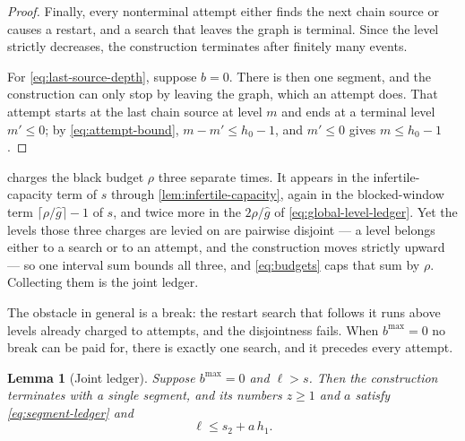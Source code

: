 \documentclass[11pt]{article}
\theoremstyle{plain}
\newtheorem{lemma}{Lemma}
\theoremstyle{remark}
\newcommand{\ghat}{\widehat g}
\begin{document}
\begin{proof}
Finally, every nonterminal attempt either finds the next chain source or causes a restart, and a
search that leaves the graph is terminal.  Since the level strictly decreases, the
construction terminates after finitely many events.

For \eqref{eq:last-source-depth}, suppose \(b=0\).  There is then one segment, and the
construction can only stop by leaving the graph, which an attempt does.  That attempt
starts at the last chain source at level \(m\) and ends at a terminal level
\(m'\le0\); by \eqref{eq:attempt-bound}, \(m-m'\le h_0-1\), and \(m'\le0\) gives
\(m\le h_0-1\).
\end{proof}

 charges the black budget \(\rho\) three separate times.  It
appears in the infertile-capacity term of \(s\) through \cref{lem:infertile-capacity},
again in the blocked-window term \(\lceil\rho/\ghat\rceil-1\) of \(s\), and twice more
in the \(2\rho/\ghat\) of \eqref{eq:global-level-ledger}.  Yet the levels those three
charges are levied on are pairwise disjoint --- a level belongs either to a search or to
an attempt, and the construction moves strictly upward --- so one interval sum bounds all
three, and \eqref{eq:budgets} caps that sum by \(\rho\).  Collecting them is the joint
ledger.

The obstacle in general is a break: the restart search that follows it runs above levels
already charged to attempts, and the disjointness fails.  When \(b^{\max}=0\) no break
can be paid for, there is exactly one search, and it precedes every attempt.

\begin{lemma}[Joint ledger]
\label{lem:joint-ledger}
Suppose \(b^{\max}=0\) and \(\ell>s\).  Then the construction terminates with a single
segment, and its numbers \(z\ge1\) and \(a\) satisfy \eqref{eq:segment-ledger} and
\begin{equation}
 \ell\le s_2+a\,h_1 .
 \label{eq:joint-level-ledger}
\end{equation}
\end{lemma}
\end{document}
